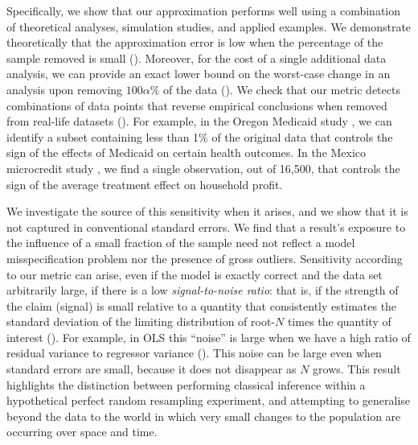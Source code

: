 Specifically, we show that our approximation performs well using a combination
of theoretical analyses, simulation studies, and applied examples. We
demonstrate theoretically that the approximation error is low when the
percentage of the sample removed is small (). Moreover, for the
cost of a single additional data analysis, we can provide an exact lower bound
on the worst-case change in an analysis upon removing $100\alpha \%$ of the data
().  We check that our metric
detects combinations of data points that reverse empirical conclusions when
removed from real-life datasets (). For example, in the Oregon
Medicaid study \citep{finkelstein2012oregon}, we can identify a subset
containing less than 1\% of the original data that controls the sign of the
effects of Medicaid on certain health outcomes. In the Mexico microcredit study
\citep{angelucci2015microcredit}, we find a single observation, out of 16,500,
that controls the sign of the average treatment effect on household profit.

We investigate the source of this sensitivity when it arises, and we show that
it is not captured in conventional standard errors. We find that a result's
exposure to the influence of a small fraction of the sample need not reflect a
model misspecification problem nor the presence of gross outliers. Sensitivity
according to our metric can arise, even if the model is exactly correct and the
data set arbitrarily large, if there is a low \emph{signal-to-noise ratio}: that
is, if the strength of the claim (signal) is small relative to a quantity that
consistently estimates the standard deviation of the limiting distribution of
root-$N$ times the quantity of interest (). For example, in OLS this
``noise'' is large when we have a high ratio of residual variance to regressor
variance (). This noise can be large even when
standard errors are small, because it does not disappear as $N$ grows. This
result highlights the distinction between performing classical inference within
a hypothetical perfect random resampling experiment, and attempting to
generalise beyond the data to the world in which very small changes to the
population are occurring over space and time.

